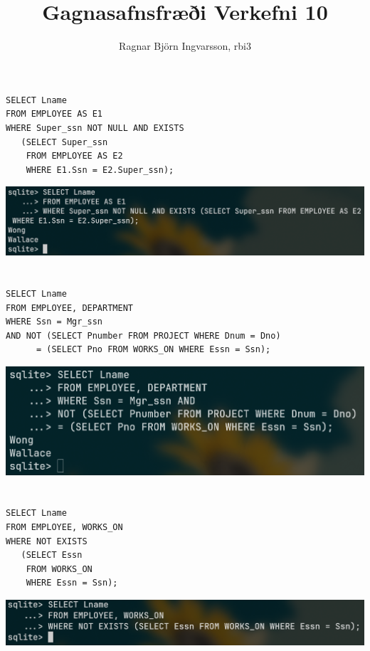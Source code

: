 \documentclass{article}
\title{Gagnasafnsfræði Verkefni 10}
\author{Ragnar Björn Ingvarsson, rbi3}
\begin{document}
\renewcommand\thepage{}

	\maketitle

	\newpage
	\setcounter{page}{1}
	\renewcommand\thepage{\arabic{page}}

	\section{}
	\begin{verbatim}
SELECT Lname
FROM EMPLOYEE AS E1
WHERE Super_ssn NOT NULL AND EXISTS
   (SELECT Super_ssn
    FROM EMPLOYEE AS E2
    WHERE E1.Ssn = E2.Super_ssn);
	\end{verbatim}
	\begin{center}
		\includegraphics[scale=0.25]{1.png}
	\end{center}

	\section{}
	\begin{verbatim}
SELECT Lname
FROM EMPLOYEE, DEPARTMENT
WHERE Ssn = Mgr_ssn
AND NOT (SELECT Pnumber FROM PROJECT WHERE Dnum = Dno)
      = (SELECT Pno FROM WORKS_ON WHERE Essn = Ssn);
	\end{verbatim}
	\begin{center}
		\includegraphics[scale=0.25]{2.png}
	\end{center}

	\section{}
	\begin{verbatim}
SELECT Lname
FROM EMPLOYEE, WORKS_ON
WHERE NOT EXISTS
   (SELECT Essn 
    FROM WORKS_ON 
    WHERE Essn = Ssn);
	\end{verbatim}
	\begin{center}
		\includegraphics[scale=0.25]{3.png}
	\end{center}
\end{document}

